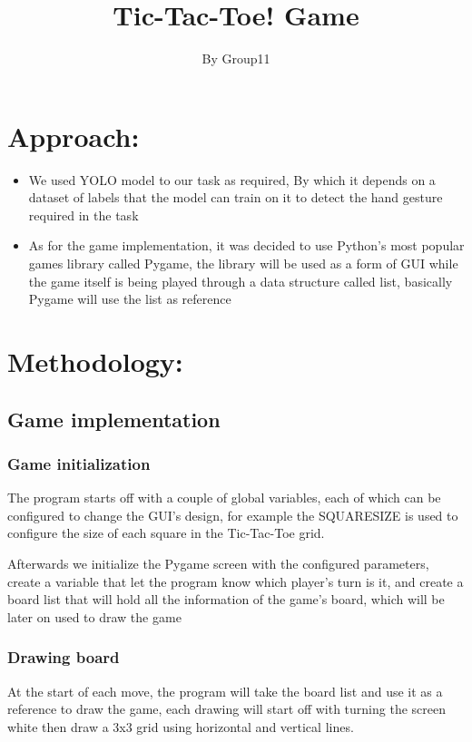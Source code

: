 \documentclass[11pt]{article}
\title{Tic-Tac-Toe! Game}
\author{ By Group11}
\begin{document}
\maketitle
\section{Approach:}
\begin{itemize}
  \item We used YOLO model to our task as required, By which it depends on a dataset of labels that the model can train on it to detect the hand gesture required in the task
  
 \item As for the game implementation, it was decided to use Python's most popular games library called Pygame, the library will be used as a form of GUI while the game itself is being played through a data structure called list, basically Pygame will use the list as reference

\end{itemize}
\section{Methodology:}
\subsection{Game implementation}
\subsubsection{Game initialization}

The program starts off with a couple of global variables, each of which can be configured to change the GUI's design, for example the SQUARESIZE is used to configure the size of each square in the Tic-Tac-Toe grid.


Afterwards we initialize the Pygame screen with the configured parameters, create a variable that let the program know which player's turn is it, and create a board list that will hold all the information of the game's board, which will be later on used to draw the game

\subsubsection{Drawing board}
At the start of each move, the program will take the board list and use it as a reference to draw the game, each drawing will start off with turning the screen white then draw a 3x3 grid using horizontal and vertical lines.
\end{document}
